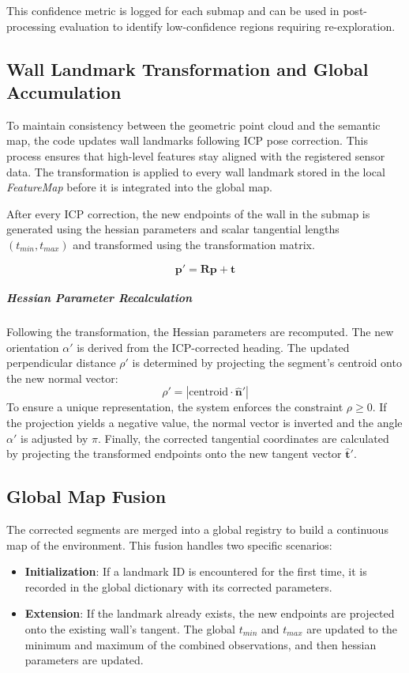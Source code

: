 \documentclass[11pt]{article}
\begin{document}
This confidence metric is logged for each submap and can be used in post-processing evaluation to identify low-confidence regions requiring re-exploration.

\subsection{Wall Landmark Transformation and Global Accumulation}

To maintain consistency between the geometric point cloud and the semantic map, the code  updates wall landmarks following ICP pose correction. This process ensures that high-level features stay aligned with the registered sensor data. The transformation is applied to every wall landmark stored in the local \textit{FeatureMap} before it is integrated into the global map.

After every ICP correction, the new endpoints of the wall in the submap is generated using the hessian parameters and scalar tangential lengths $(t_{min}, t_{max})$ and transformed using the transformation matrix.

\begin{equation}
	\mathbf{p}' = \mathbf{R} \mathbf{p} + \mathbf{t}
\end{equation}


\subparagraph{Hessian Parameter Recalculation}
Following the transformation, the Hessian parameters are recomputed. The new orientation $\alpha'$ is derived from the ICP-corrected heading. The updated perpendicular distance $\rho'$ is determined by projecting the segment's centroid onto the new normal vector:
\begin{equation}
	\rho' = | \text{centroid} \cdot \mathbf{\hat{n}}' |
\end{equation}
To ensure a unique representation, the system enforces the constraint $\rho \ge 0$. If the projection yields a negative value, the normal vector is inverted and the angle $\alpha'$ is adjusted by $\pi$. Finally, the corrected tangential coordinates are calculated by projecting the transformed endpoints onto the new tangent vector $\mathbf{\hat{t}}'$.

\subsection{Global Map Fusion}
The corrected segments are merged into a global registry to build a continuous map of the environment. This fusion handles two specific scenarios:

\begin{itemize}
	\item \textbf{Initialization}: If a landmark ID is encountered for the first time, it is recorded in the global dictionary with its corrected parameters.
	\item \textbf{Extension}: If the landmark already exists, the new endpoints are projected onto the existing wall's tangent. The global $t_{min}$ and $t_{max}$ are updated to the minimum and maximum of the combined observations, and then hessian parameters are updated.
\end{itemize}
\end{document}
